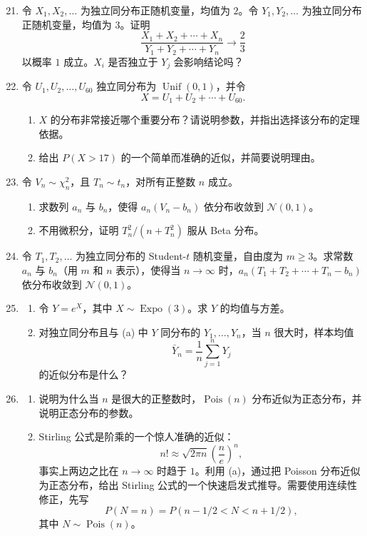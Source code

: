 \documentclass[UTF8, 12pt, fontset=fandol, oneside]{ctexart}
\begin{document}
\begin{enumerate}
  \setcounter{enumi}{20}
  \item 令 $X_1,X_2,\ldots$ 为独立同分布正随机变量，均值为 $2$。令 $Y_1,Y_2,\ldots$ 为独立同分布正随机变量，均值为 $3$。证明
  \[
    \frac{X_1+X_2+\cdots+X_n}{Y_1+Y_2+\cdots+Y_n}\to \frac23
  \]
  以概率 $1$ 成立。$X_i$ 是否独立于 $Y_j$ 会影响结论吗？

  \item 令 $U_1,U_2,\ldots,U_{60}$ 独立同分布为 $\operatorname{Unif}(0,1)$，并令
  \[
    X=U_1+U_2+\cdots+U_{60}.
  \]
  \begin{enumerate}
    \item $X$ 的分布非常接近哪个重要分布？请说明参数，并指出选择该分布的定理依据。
    \item 给出 $P(X>17)$ 的一个简单而准确的近似，并简要说明理由。
  \end{enumerate}

  \item 令 $V_n\sim\chi_n^2$，且 $T_n\sim t_n$，对所有正整数 $n$ 成立。
  \begin{enumerate}
    \item 求数列 $a_n$ 与 $b_n$，使得 $a_n(V_n-b_n)$ 依分布收敛到 $\mathcal N(0,1)$。
    \item 不用微积分，证明 $T_n^2/(n+T_n^2)$ 服从 Beta 分布。
  \end{enumerate}

  \item 令 $T_1,T_2,\ldots$ 为独立同分布的 Student-$t$ 随机变量，自由度为 $m\ge 3$。求常数 $a_n$ 与 $b_n$（用 $m$ 和 $n$ 表示），使得当 $n\to\infty$ 时，$a_n(T_1+T_2+\cdots+T_n-b_n)$ 依分布收敛到 $\mathcal N(0,1)$。

  \item
  \begin{enumerate}
    \item 令 $Y=e^X$，其中 $X\sim\operatorname{Expo}(3)$。求 $Y$ 的均值与方差。
    \item 对独立同分布且与 (a) 中 $Y$ 同分布的 $Y_1,\ldots,Y_n$，当 $n$ 很大时，样本均值
    \[
      \bar Y_n=\frac1n\sum_{j=1}^n Y_j
    \]
    的近似分布是什么？
  \end{enumerate}

  \item
  \begin{enumerate}
    \item 说明为什么当 $n$ 是很大的正整数时，$\operatorname{Pois}(n)$ 分布近似为正态分布，并说明正态分布的参数。
    \item Stirling 公式是阶乘的一个惊人准确的近似：
    \[
      n!\approx \sqrt{2\pi n}\left(\frac ne\right)^n,
    \]
    事实上两边之比在 $n\to\infty$ 时趋于 $1$。利用 (a)，通过把 Poisson 分布近似为正态分布，给出 Stirling 公式的一个快速启发式推导。需要使用连续性修正，先写
    \[
      P(N=n)=P(n-1/2<N<n+1/2),
    \]
    其中 $N\sim\operatorname{Pois}(n)$。
  \end{enumerate}


\end{enumerate}
\end{document}
